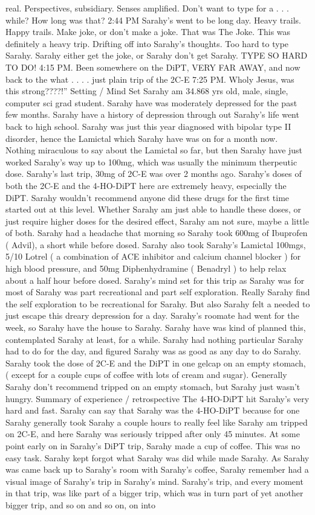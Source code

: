 \documentclass[12pt]{book}
\begin{document}
real. Perspectives, subsidiary. Senses amplified. Don't want to type for a  . . .  while? How long was that? 2:44 PM Sarahy's went to be long day. Heavy trails. Happy trails. Make joke, or don't make a joke. That was The Joke. This was definitely a heavy trip. Drifting off into Sarahy's thoughts. Too hard to type Sarahy. Sarahy either get the joke, or Sarahy don't get Sarahy. TYPE SO HARD TO DO! 4:15 PM. Been somewhere on the DiPT, VERY FAR AWAY, and now back to the what . . .  . just plain trip of the 2C-E 7:25 PM. Wholy Jesus, was this strong????!'' Setting / Mind Set Sarahy am 34.868 yrs old, male, single, computer sci grad student. Sarahy have was moderately depressed for the past few months. Sarahy have a history of depression through out Sarahy's life went back to high school. Sarahy was just this year diagnosed with bipolar type II disorder, hence the Lamictal which Sarahy have was on for a month now. Nothing miraculous to say about the Lamictal so far, but then Sarahy have just worked Sarahy's way up to 100mg, which was usually the minimum therpeutic dose. Sarahy's last trip, 30mg of 2C-E was over 2 months ago. Sarahy's doses of both the 2C-E and the 4-HO-DiPT here are extremely heavy, especially the DiPT. Sarahy wouldn't recommend anyone did these drugs for the first time started out at this level. Whether Sarahy am just able to handle these doses, or just require higher doses for the desired effect, Sarahy am not sure, maybe a little of both. Sarahy had a headache that morning so Sarahy took 600mg of Ibuprofen ( Advil), a short while before dosed. Sarahy also took Sarahy's Lamictal 100mgs, 5/10 Lotrel ( a combination of ACE inhibitor and calcium channel blocker ) for high blood pressure, and 50mg Diphenhydramine ( Benadryl ) to help relax about a half hour before dosed. Sarahy's mind set for this trip as Sarahy was for most of Sarahy was part recreational and part self exploration. Really Sarahy find the self exploration to be recreational for Sarahy. But also Sarahy felt a needed to just escape this dreary depression for a day. Sarahy's roomate had went for the week, so Sarahy have the house to Sarahy. Sarahy have was kind of planned this, contemplated Sarahy at least, for a while. Sarahy had nothing particular Sarahy had to do for the day, and figured Sarahy was as good as any day to do Sarahy. Sarahy took the dose of 2C-E and the DiPT in one gelcap on an empty stomach, ( except for a couple cups of coffee with lots of cream and sugar). Generally Sarahy don't recommend tripped on an empty stomach, but Sarahy just wasn't hungry. Summary of experience / retrospective The 4-HO-DiPT hit Sarahy's very hard and fast. Sarahy can say that Sarahy was the 4-HO-DiPT because for one Sarahy generally took Sarahy a couple hours to really feel like Sarahy am tripped on 2C-E, and here Sarahy was seriously tripped after only 45 minutes. At some point early on in Sarahy's DiPT trip, Sarahy made a cup of coffee. This was no easy task. Sarahy kept forgot what Sarahy was did while made Sarahy. As Sarahy was came back up to Sarahy's room with Sarahy's coffee, Sarahy remember had a visual image of Sarahy's trip in Sarahy's mind. Sarahy's trip, and every moment in that trip, was like part of a bigger trip, which was in turn part of yet another bigger trip, and so on and so on, on into 
\end{document}
